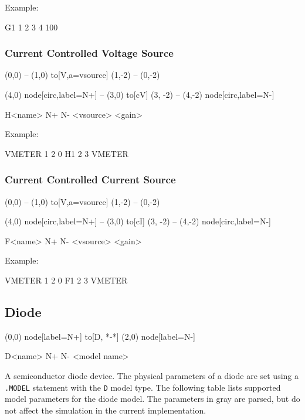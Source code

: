Example: 

\begin{code}
G1 1 2 3 4 100
\end{code}


\subsubsection{Current Controlled Voltage Source}
\begin{circuitdev}
	(0,0) 
	-- (1,0)
	to[V,a=vsource] (1,-2)
	-- (0,-2)
	
	(4,0) node[circ,label=N+]{}
	-- (3,0)
	to[cV] (3, -2)
	-- (4,-2) node[circ,label=N-]{}
\end{circuitdev}
\begin{code}
H<name> N+ N- <vsource> <gain>
\end{code}

Example: 

\begin{code}
VMETER 1 2 0
H1 2 3 VMETER
\end{code}

\subsubsection{Current Controlled Current Source}
\begin{circuitdev}
	(0,0) 
	-- (1,0)
	to[V,a=vsource] (1,-2)
	-- (0,-2)
	
	(4,0) node[circ,label=N+]{}
	-- (3,0)
	to[cI] (3, -2)
	-- (4,-2) node[circ,label=N-]{}
\end{circuitdev}
\begin{code}
F<name> N+ N- <vsource> <gain>
\end{code}

Example: 

\begin{code}
VMETER 1 2 0
F1 2 3 VMETER
\end{code}

\subsection{Diode}
\begin{circuitdev}
	(0,0) node[label=N+]{} to[D, *-*] (2,0) node[label=N-]{}
\end{circuitdev}

\begin{code}
D<name> N+ N- <model name>
\end{code}

A semiconductor diode device. The physical parameters of a diode are set using a \texttt{.MODEL} statement with the \texttt{D} model type. The following table lists supported model parameters for the diode model. The parameters in gray are parsed, but do not affect the simulation in the current implementation.

